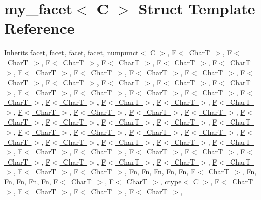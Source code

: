 \hypertarget{structmy__facet}{}\section{my\+\_\+facet$<$ C $>$ Struct Template Reference}
\label{structmy__facet}


Inherits facet, facet, facet, facet, numpunct$<$ C $>$, \mbox{\hyperlink{struct_f}{F$<$ Char\+T $>$}}, \mbox{\hyperlink{struct_f}{F$<$ Char\+T $>$}}, \mbox{\hyperlink{struct_f}{F$<$ Char\+T $>$}}, \mbox{\hyperlink{struct_f}{F$<$ Char\+T $>$}}, \mbox{\hyperlink{struct_f}{F$<$ Char\+T $>$}}, \mbox{\hyperlink{struct_f}{F$<$ Char\+T $>$}}, \mbox{\hyperlink{struct_f}{F$<$ Char\+T $>$}}, \mbox{\hyperlink{struct_f}{F$<$ Char\+T $>$}}, \mbox{\hyperlink{struct_f}{F$<$ Char\+T $>$}}, \mbox{\hyperlink{struct_f}{F$<$ Char\+T $>$}}, \mbox{\hyperlink{struct_f}{F$<$ Char\+T $>$}}, \mbox{\hyperlink{struct_f}{F$<$ Char\+T $>$}}, \mbox{\hyperlink{struct_f}{F$<$ Char\+T $>$}}, \mbox{\hyperlink{struct_f}{F$<$ Char\+T $>$}}, \mbox{\hyperlink{struct_f}{F$<$ Char\+T $>$}}, \mbox{\hyperlink{struct_f}{F$<$ Char\+T $>$}}, \mbox{\hyperlink{struct_f}{F$<$ Char\+T $>$}}, \mbox{\hyperlink{struct_f}{F$<$ Char\+T $>$}}, \mbox{\hyperlink{struct_f}{F$<$ Char\+T $>$}}, \mbox{\hyperlink{struct_f}{F$<$ Char\+T $>$}}, \mbox{\hyperlink{struct_f}{F$<$ Char\+T $>$}}, \mbox{\hyperlink{struct_f}{F$<$ Char\+T $>$}}, \mbox{\hyperlink{struct_f}{F$<$ Char\+T $>$}}, \mbox{\hyperlink{struct_f}{F$<$ Char\+T $>$}}, \mbox{\hyperlink{struct_f}{F$<$ Char\+T $>$}}, \mbox{\hyperlink{struct_f}{F$<$ Char\+T $>$}}, \mbox{\hyperlink{struct_f}{F$<$ Char\+T $>$}}, \mbox{\hyperlink{struct_f}{F$<$ Char\+T $>$}}, \mbox{\hyperlink{struct_f}{F$<$ Char\+T $>$}}, \mbox{\hyperlink{struct_f}{F$<$ Char\+T $>$}}, \mbox{\hyperlink{struct_f}{F$<$ Char\+T $>$}}, \mbox{\hyperlink{struct_f}{F$<$ Char\+T $>$}}, \mbox{\hyperlink{struct_f}{F$<$ Char\+T $>$}}, \mbox{\hyperlink{struct_f}{F$<$ Char\+T $>$}}, \mbox{\hyperlink{struct_f}{F$<$ Char\+T $>$}}, \mbox{\hyperlink{struct_f}{F$<$ Char\+T $>$}}, \mbox{\hyperlink{struct_f}{F$<$ Char\+T $>$}}, \mbox{\hyperlink{struct_f}{F$<$ Char\+T $>$}}, \mbox{\hyperlink{struct_f}{F$<$ Char\+T $>$}}, \mbox{\hyperlink{struct_f}{F$<$ Char\+T $>$}}, \mbox{\hyperlink{struct_f}{F$<$ Char\+T $>$}}, \mbox{\hyperlink{struct_f}{F$<$ Char\+T $>$}}, \mbox{\hyperlink{struct_f}{F$<$ Char\+T $>$}}, \mbox{\hyperlink{struct_f}{F$<$ Char\+T $>$}}, \mbox{\hyperlink{struct_f}{F$<$ Char\+T $>$}}, \mbox{\hyperlink{struct_f}{F$<$ Char\+T $>$}}, \mbox{\hyperlink{struct_f}{F$<$ Char\+T $>$}}, \mbox{\hyperlink{struct_f}{F$<$ Char\+T $>$}}, \mbox{\hyperlink{struct_f}{F$<$ Char\+T $>$}}, \mbox{\hyperlink{struct_f}{F$<$ Char\+T $>$}}, \mbox{\hyperlink{struct_f}{F$<$ Char\+T $>$}}, \mbox{\hyperlink{struct_f}{F$<$ Char\+T $>$}}, \mbox{\hyperlink{struct_f}{F$<$ Char\+T $>$}}, Fn, Fn, Fn, Fn, Fn, \mbox{\hyperlink{struct_f}{F$<$ Char\+T $>$}}, Fn, Fn, Fn, Fn, Fn, \mbox{\hyperlink{struct_f}{F$<$ Char\+T $>$}}, \mbox{\hyperlink{struct_f}{F$<$ Char\+T $>$}}, ctype$<$ C $>$, \mbox{\hyperlink{struct_f}{F$<$ Char\+T $>$}}, \mbox{\hyperlink{struct_f}{F$<$ Char\+T $>$}}, \mbox{\hyperlink{struct_f}{F$<$ Char\+T $>$}}, \mbox{\hyperlink{struct_f}{F$<$ Char\+T $>$}}, 